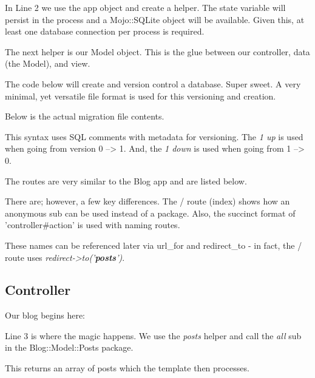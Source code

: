 \documentclass[14pt]{extreport}
\begin{document}
In Line 2 we use the app object and create a helper.  The state variable will
persist in the process and a Mojo::SQLite object will be available.  Given
this, at least one database connection per process is required.

The next helper is our Model object.  This is the glue between our controller,
data (the Model), and view.

The code below will create and version control a database.  Super sweet.  A
very minimal, yet versatile file format is used for this versioning and
creation.



Below is the actual migration file contents.



This syntax uses SQL comments with metadata for versioning.  The  \textit{1 up}
is used when going from version 0 --> 1.  And, the \textit{1 down} is used when
going from 1 --> 0.

The routes are very similar to the Blog app and are listed below.



There are; however, a few key differences.  The / route (index) shows how an
anonymous sub can be used instead of a package.  Also, the succinct format of
'controller\#action' is used with naming routes.  

These names can be referenced later via url\_for and redirect\_to - in fact,
the / route uses \textit{redirect->to('\textbf{posts}')}.

\subsection{Controller}

Our blog begins here:



Line 3 is where the magic happens. We use the \textit{posts} helper and call
the \textit{all} sub in the Blog::Model::Posts package.  

This returns an array of posts which the template then processes.
\end{document}
